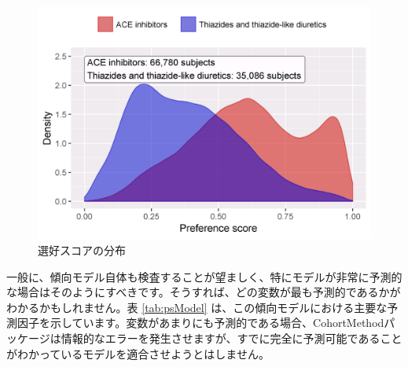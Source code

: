 \documentclass[
  11pt]{book}
\theoremstyle{definition}
\theoremstyle{definition}
\theoremstyle{definition}
\theoremstyle{definition}
\theoremstyle{remark}
\begin{document}
\begin{figure}

{\centering \includegraphics[width=0.8\linewidth]{images/PopulationLevelEstimation/ps} 

}

\caption{選好スコアの分布}\label{fig:ps}
\end{figure}

一般に、傾向モデル自体も検査することが望ましく、特にモデルが非常に予測的な場合はそのようにすべきです。そうすれば、どの変数が最も予測的であるかがわかるかもしれません。表 \ref{tab:psModel} は、この傾向モデルにおける主要な予測因子を示しています。変数があまりにも予測的である場合、CohortMethodパッケージは情報的なエラーを発生させますが、すでに完全に予測可能であることがわかっているモデルを適合させようとはしません。 
\end{document}
